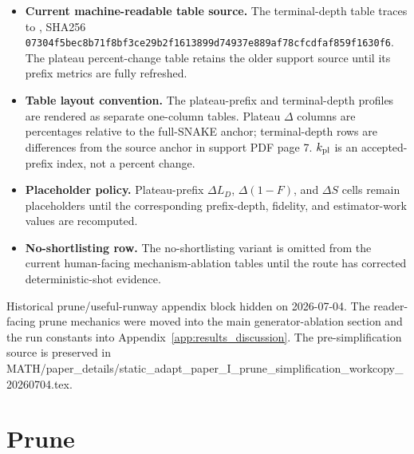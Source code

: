 \documentclass[
  reprint,
  amsmath,
  amssymb,
  aps,
  pra,
  nofootinbib,
  superscriptaddress,
  floatfix
]{revtex4-2}
\begin{document}
\begin{itemize}
\item \textbf{Current machine-readable table source.} The terminal-depth table traces to , SHA256 \texttt{07304f5bec8b71f8bf3ce29b2f1613899d74937e889af78cfcdfaf859f1630f6}. The plateau percent-change table retains the older support source until its prefix metrics are fully refreshed.
\item \textbf{Table layout convention.} The plateau-prefix and terminal-depth profiles are rendered as separate one-column tables. Plateau \(\Delta\) columns are percentages relative to the full-SNAKE anchor; terminal-depth rows are differences from the source anchor in support PDF page 7. \(k_{\rm pl}\) is an accepted-prefix index, not a percent change.
\item \textbf{Placeholder policy.} Plateau-prefix \(\Delta L_D\), \(\Delta(1-F)\), and \(\Delta S\) cells remain placeholders until the corresponding prefix-depth, fidelity, and estimator-work values are recomputed.
\item \textbf{No-shortlisting row.} The no-shortlisting variant is omitted from the current human-facing mechanism-ablation tables until the route has corrected deterministic-shot evidence.
\end{itemize}

\fi

\iffalse
Historical prune/useful-runway appendix block hidden on 2026-07-04.  The
reader-facing prune mechanics were moved into the main generator-ablation
section and the run constants into Appendix~\ref{app:results_discussion}.
The pre-simplification source is preserved in
MATH/paper_details/static_adapt_paper_I_prune_simplification_workcopy_20260704.tex.

\section{Prune}
\label{app:prune}
\end{document}
